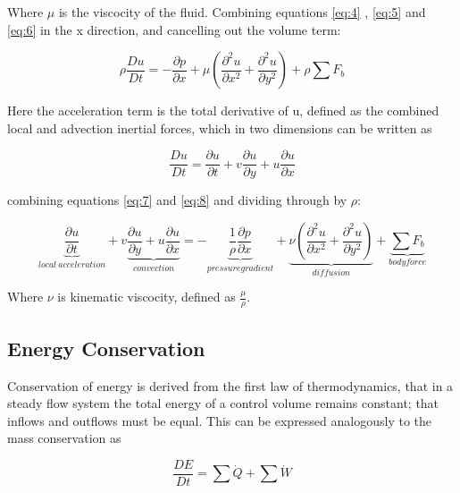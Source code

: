     Where $\mu$ is the viscocity of the fluid. Combining equations \ref{eq:4} , \ref{eq:5} and \ref{eq:6} in the x direction, and cancelling out the volume term:

    \begin{equation} \label{eq:7}
      \rho \frac{Du}{Dt} = - \frac{\partial p}{\partial x} + \mu (\frac{\partial^2 u}{\partial x^2} + \frac{\partial^2 u}{\partial y^2}) + \rho \sum F_{b}
    \end{equation}
    
    Here the acceleration term is the total derivative of u, defined as the combined local and advection inertial forces, which in two dimensions can be written as

    \begin{equation} \label{eq:8}
      \frac{Du}{Dt} = \frac{\partial u}{\partial t} + v \frac{\partial u}{\partial y} + u \frac{\partial u}{\partial x}
    \end{equation}

    combining equations \ref{eq:7} and \ref{eq:8} and dividing through by $\rho$:

    \begin{equation} \label{eq:9}
      \underbrace{\frac{\partial u}{\partial t}}_{local\ acceleration} + v \underbrace{\frac{\partial u}{\partial y} + u \frac{\partial u}{\partial x}}_{convection} = - \underbrace{\frac{1}{\rho} \frac{\partial p}{\partial x}}_{pressure gradient} + \underbrace{\nu (\frac{\partial^2 u}{\partial x^2} + \frac{\partial^2 u}{\partial y^2})}_{diffusion} + \underbrace{\sum F_{b}}_{body force}
    \end{equation}

    Where $\nu$ is kinematic viscocity, defined as $\frac{\mu}{\rho}$. 

    \subsection{Energy Conservation}

    Conservation of energy is derived from the first law of thermodynamics, that in a steady flow system the total energy of a control volume remains constant; that inflows and outflows must be equal. This can be expressed analogously to the mass conservation as 

    \begin{equation} \label{eq:10}
      \frac{DE}{Dt} = \sum{\dot{Q}} + \sum{\dot{W}}
    \end{equation}

